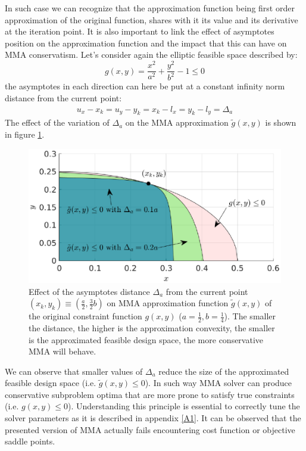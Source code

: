 In such case we can recognize that the approximation function being first order approximation of the original function, shares with it its value and its derivative at the iteration point. It is also important to link the effect of asymptotes position on the approximation function and the impact that this can have on MMA conservatism. Let's consider again the elliptic feasible space described by:
\begin{equation}
g(x,y)=\frac{x^2}{a^2}+\frac{y^2}{b^2}-1\leq 0
\end{equation}
the asymptotes in each direction can here be put at a constant infinity norm distance from the current point:
\begin{eqnarray}
u_x-x_k=u_y-y_k=x_k-l_x=y_k-l_y=\Delta_a
\end{eqnarray}
The effect of the variation of $\Delta_a$ on the MMA approximation $\tilde{g}(x,y)$ is shown in figure \ref{fig.2.5b}.  
\begin{figure}[ht]
\centering
\includegraphics[width=12cm]{images/Ch2/MMA_conservatism}
\caption{Effect of the asymptotes distance $\Delta_a$ from the current point $(x_k,y_k)\equiv\left(\frac{a}{2},\frac{3}{2}b\right)$ on MMA approximation function $\tilde{g}(x,y)$ of the original constraint function $g(x,y)$  ($a=\frac{1}{2},b=\frac{1}{4}$). The smaller the distance, the higher is the approximation convexity, the smaller is the approximated feasible design space, the more conservative MMA will behave.}
\label{fig.2.5b}
\end{figure}
We can observe that smaller values of $\Delta_a$ reduce the size of the approximated feasible design space (i.e. $\tilde{g}(x,y)\leq 0$). In such way MMA solver can produce conservative subproblem optima that are more prone to satisfy true constraints (i.e. $g(x,y)\leq 0$). Understanding this principle is essential to correctly tune the solver parameters as it is described in appendix \ref{A1}.
It can be observed that the presented version of MMA actually fails encountering cost function or objective saddle points.
